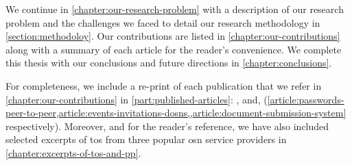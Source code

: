 \documentclass[showtrims,oldfontcommands]{kthesis}
\begin{document}
We continue in \cref{chapter:our-research-problem} with a description of our research 
problem and the challenges we faced to detail our research methodology 
in \cref{section:methodoloy}. Our contributions are listed in \cref{chapter:our-contributions} 
along with a summary of each article for the reader's convenience. We complete this 
thesis with our conclusions and future directions in \cref{chapter:conclusions}.

For completeness, we include a re-print of each publication that we refer in \cref{chapter:our-contributions} 
in \cref{part:published-articles}: ,  
and,  (\cref{article:passwords-peer-to-peer,article:events-invitations-dosns,,article:document-submission-system} 
respectively). Moreover, and for the reader's reference, we have also included selected 
excerpts of \ac{tos} from three popular \ac{osn} service providers in \cref{chapter:excerpts-of-tos-and-pp}.
\end{document}
